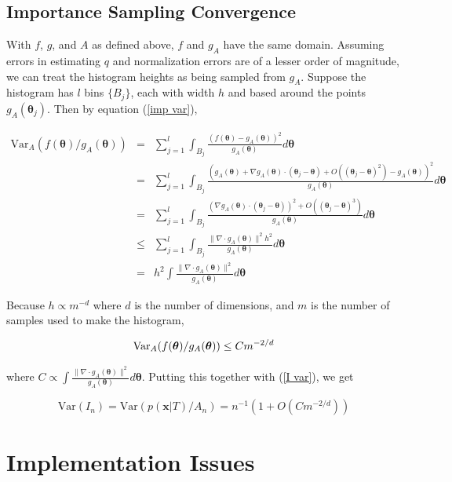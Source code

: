 \documentclass[letterpaper,12pt]{article}
\newcommand{\bx}{\boldsymbol x}
\newcommand{\btheta}{\boldsymbol \theta}
\newcommand{\norm}[1]{\lVert#1\rVert}
\begin{document}
\subsection{Importance Sampling Convergence}

With $f$, $g$, and $A$ as defined above, $f$ and $g_A$ have the same
domain.  Assuming errors in estimating $q$ and normalization errors
are of a lesser order of magnitude, we can treat the histogram heights
as being sampled from $g_A$.  Suppose the histogram has $l$ bins
$\{B_j\}$, each with width $h$ and based around the points
$g_A(\btheta_j)$.  Then by equation (\ref{imp var}),

\begin{eqnarray*}
  \mbox{Var}_A(f(\btheta) / g_A(\btheta)) &=&
     \sum_{j=1}^l \int_{B_j} \frac{(f(\btheta) - g_A(\btheta))^2}{g_A(\btheta)}d\btheta\\
     &=& \sum_{j=1}^l \int_{B_j} \frac{(g_A(\btheta) + \nabla g_A(\btheta)\cdot(\btheta_j - \btheta) + O((\btheta_j - \btheta)^2) - g_A(\btheta))^2}{g_A(\btheta)}d\btheta\\
     &=& \sum_{j=1}^l \int_{B_j} \frac{(\nabla g_A(\btheta)\cdot(\btheta_j - \btheta))^2 + O((\btheta_j - \btheta)^3)}{g_A(\btheta)}d\btheta\\
     &\leq& \sum_{j=1}^l \int_{B_j} \frac{\norm{\nabla \cdot g_A(\btheta)}^2 h^2}{g_A(\btheta)} d\btheta\\
     &=& h^2 \int \frac{\norm{\nabla \cdot g_A(\btheta)}^2}{g_A(\btheta)} d\btheta \label{h var}
\end{eqnarray*}

Because $h \propto m^{-d}$ where $d$ is the number of dimensions, and
$m$ is the number of samples used to make the histogram,

\begin{equation*}
  \mbox{Var}_A(f(\btheta) / g_A(\btheta)) \leq Cm^{-2/d}\\
\end{equation*}

\noindent where $C \propto \int \frac{\norm{\nabla \cdot
    g_A(\btheta)}^2}{g_A(\btheta)} d\btheta$.  Putting this together
with (\ref{I var}), we get

\begin{equation}
  \label{final variance}
  \mbox{Var}(I_n) = \mbox{Var}(p(\bx|T) / A_n) = n^{-1}(1+O(Cm^{-2/d}))
\end{equation}

\section{Implementation Issues}
\end{document}
